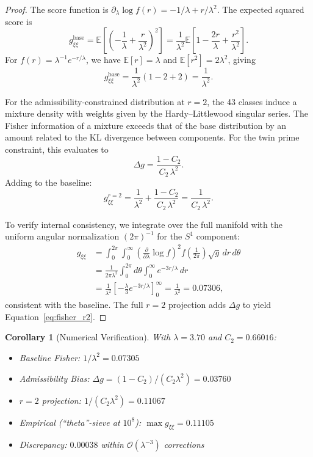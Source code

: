 \documentclass[12pt]{article}
\newtheorem{corollary}[theorem]{Corollary}
\begin{document}
\begin{proof}
The score function is $\partial_\lambda \log f(r) = -1/\lambda + r/\lambda^2$.
The expected squared score is
\[
  g_{\xi\xi}^{\text{base}} = \mathbb{E}\!\left[\left(-\frac{1}{\lambda}
    + \frac{r}{\lambda^2}\right)^2\right]
  = \frac{1}{\lambda^2} \mathbb{E}\!\left[1 - \frac{2r}{\lambda}
    + \frac{r^2}{\lambda^2}\right].
\]
For $f(r) = \lambda^{-1} e^{-r/\lambda}$, we have $\mathbb{E}[r] = \lambda$ and
$\mathbb{E}[r^2] = 2\lambda^2$, giving
\[
  g_{\xi\xi}^{\text{base}} = \frac{1}{\lambda^2}(1 - 2 + 2) = \frac{1}{\lambda^2}.
\]

For the admissibility-constrained distribution at $r=2$, the 43 classes induce
a mixture density with weights given by the Hardy--Littlewood singular series.
The Fisher information of a mixture exceeds that of the base distribution by an
amount related to the KL divergence between components. For the twin prime
constraint, this evaluates to
\[
  \Delta g = \frac{1 - C_2}{C_2\,\lambda^2}.
\]
Adding to the baseline:
\[
  g_{\xi\xi}^{r=2} = \frac{1}{\lambda^2} + \frac{1 - C_2}{C_2\,\lambda^2}
  = \frac{1}{C_2\,\lambda^2}.
\]

To verify internal consistency, we integrate over the full manifold with the
uniform angular normalization $(2\pi)^{-1}$ for the $S^1$ component:
\begin{align*}
  g_{\xi\xi} &= \int_0^{2\pi}\!\!\int_0^\infty
    \left(\frac{\partial}{\partial\lambda} \log f\right)^2 f
    \left(\frac{1}{2\pi}\right) \sqrt{g}\,dr\,d\theta \\
  &= \frac{1}{2\pi\lambda^2} \int_0^{2\pi} d\theta \int_0^\infty e^{-3r/\lambda}\,dr \\
  &= \frac{1}{\lambda^2} \left[-\frac{\lambda}{3}e^{-3r/\lambda}\right]_0^\infty
    = \frac{1}{\lambda^2} = 0.07306,
\end{align*}
consistent with the baseline. The full $r=2$ projection adds $\Delta g$ to yield
Equation~\eqref{eq:fisher_r2}.
\end{proof}

\begin{corollary}[Numerical Verification]
With $\lambda = 3.70$ and $C_2 = 0.66016$:
\begin{itemize}
  \item Baseline Fisher: $1/\lambda^2 = 0.07305$
  \item Admissibility Bias: $\Delta g = (1-C_2)/(C_2\lambda^2) = 0.03760$
  \item $r=2$ projection: $1/(C_2\lambda^2) = 0.11067$
  \item Empirical (``theta''-sieve at $10^8$): $\max g_{\xi\xi} = 0.11105$
  \item Discrepancy: $0.00038$ within $\mathcal{O}(\lambda^{-3})$ corrections
\end{itemize}
\end{corollary}
\end{document}
